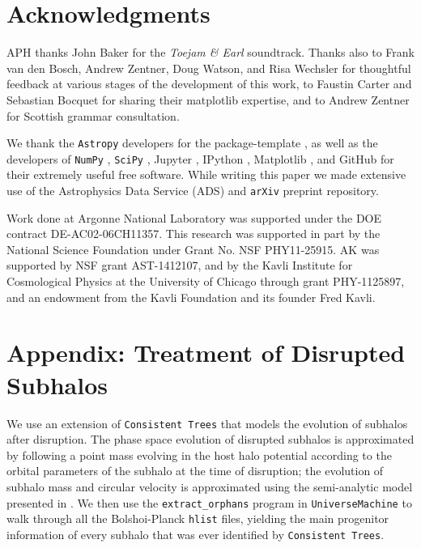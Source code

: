 \documentclass[usenatbib,usegraphicx,letterpaper]{mn2e}
\begin{document}
\section*{Acknowledgments}

APH thanks John Baker for the {\em Toejam \& Earl} soundtrack. Thanks also to Frank van den Bosch, Andrew Zentner, Doug Watson, and Risa Wechsler for thoughtful feedback at various stages of the development of this work, to Faustin Carter and Sebastian Bocquet for sharing their matplotlib expertise, and to Andrew Zentner for Scottish grammar consultation.

We thank the {\tt Astropy} developers for the package-template \citep{astropy}, as well as the developers of {\tt NumPy} \citep{numpy_ndarray}, {\tt SciPy} \citep{scipy}, Jupyter \citep{jupyter}, IPython \citep{ipython}, Matplotlib \citep{matplotlib}, and GitHub for their extremely useful free software. While writing this paper we made extensive use of the Astrophysics Data Service (ADS) and {\tt arXiv} preprint repository.

Work done at Argonne National Laboratory was supported under the DOE contract DE-AC02-06CH11357. This research was supported in part by the National Science Foundation under Grant No. NSF PHY11-25915.  AK was  supported by NSF grant  AST-1412107, and by the Kavli Institute for Cosmological Physics at the University of Chicago through grant PHY-1125897, and an endowment from the Kavli Foundation and its founder Fred Kavli.



\section*{Appendix: Treatment of Disrupted Subhalos}

We use an extension of {\tt Consistent Trees} that models the evolution of subhalos after disruption. The phase space evolution of disrupted subhalos is approximated by following a point mass evolving in the host halo potential according to the orbital parameters of the subhalo at the time of disruption; the evolution of subhalo mass and circular velocity is approximated using the semi-analytic model presented in \citet{jiang_vdB14}. We then use the {\tt extract\_orphans} program in {\tt UniverseMachine} to walk through all the Bolshoi-Planck {\tt hlist} files, yielding the main progenitor information of every subhalo that was ever identified by {\tt Consistent Trees}.
\end{document}
